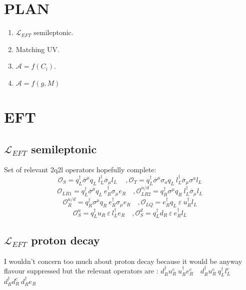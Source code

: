 \documentclass{article}
\begin{document}
\section{PLAN}
\begin{enumerate}
\item $\mathcal{L}_{EFT}$ semileptonic.
\item Matching UV.
\item $\mathcal{A}=f(C_i)$.
\item $\mathcal{A}=f(g,M)$
\end{enumerate}
\section{EFT}
\subsection{$\mathcal{L}_{EFT}$ semileptonic}
Set of relevant 2q2l operators hopefully complete:
\[ %
\mathcal{O}_S= q_L^\dagger \overline{\sigma}^\mu q_L \ l_L^\dagger \overline{\sigma}_\mu l_L \  \quad,\mathcal{O}_T=q_L^\dagger \overline{\sigma}^\mu  \sigma_a q_L \ l_L^\dagger \overline{\sigma}_\mu \sigma^a l_L
\]
\[ %
\mathcal{O}_{LR1}= q_L^\dagger \overline{\sigma}^\mu q_L \ e_R^\dagger \sigma_\mu e_R \quad, \mathcal{O}_{LR2}^{u/d}= q_R^\dagger \sigma^\mu q_R \ l_L^\dagger \overline{\sigma}_\mu l_L 
\]
\[ %
\mathcal{O}^{u/d}_R = q_R^\dagger \sigma^\mu q_R \ e_R^\dagger \sigma_\mu e_R \quad, \mathcal{O}_{LQ} = e_R^\dagger q_L \ \varepsilon \ u_R^\dagger l_L 
\]
\[
\mathcal{O}^u_S = q_L^\dagger u_R \ \varepsilon \ l_L^\dagger e_R \quad, \mathcal{O}^d_{S}= q_L^\dagger d_R \ \varepsilon \ e_R^\dagger l_L 
\]
\subsection{$\mathcal{L}_{EFT}$ proton decay}
I wouldn't concern too much about proton decay because it would be anyway flavour suppressed but the relevant operators are : $ d_R^\dagger u_R^c \ u_R^\dagger e_R^c \quad  d_R^\dagger u_R^c \ q_L^\dagger l_L^c $ $ d_R^\dagger d_R^c \ d_R^\dagger e_R $
\end{document}
